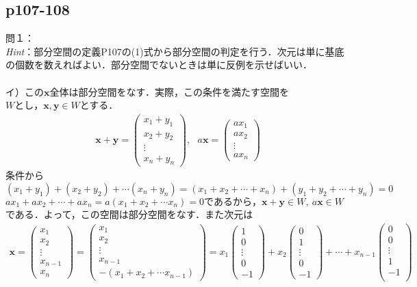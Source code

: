 \documentclass[dvipdfmx,uplatex,11pt]{jsarticle}
\begin{document}
\subsection{p107-108}
\noindent
問１：\\
\textsl{Hint}：部分空間の定義P107の(1)式から部分空間の判定を行う．次元は単に基底の個数を数えればよい．部分空間でないときは単に反例を示せばいい．\\
\dotfill \\
イ）この$\bm{x}全体は$部分空間をなす．実際，この条件を満たす空間を$Wとし，\bm{x,y} \in W$とする．
\begin{eqnarray*}
\bm{x}+\bm{y}=
\begin{pmatrix}
x_1+y_1 \\
x_2+y_2 \\
\vdots \\
x_n+y_n
\end{pmatrix}
,~~~
a\bm{x}=
\begin{pmatrix}
ax_1 \\
ax_2 \\
\vdots \\
ax_n
\end{pmatrix}
\end{eqnarray*}
条件から$(x_1+y_1)+(x_2+y_2)+\cdots (x_n+y_n)=(x_1+x_2+\cdots +x_n)+(y_1+y_2+\cdots +y_n)=0$\\
$ax_1+ax_2+ \cdots +ax_n=a(x_1+x_2+\cdots x_n)=0であるから，\bm{x}+\bm{y} \in W,~a\bm{x} \in W$である．よって，この空間は部分空間をなす．また次元は
\begin{eqnarray*}
\bm{x}=
\begin{pmatrix}
x_1 \\
x_2 \\
\vdots \\
x_{n-1} \\
x_n
\end{pmatrix}
=
\begin{pmatrix}
x_1 \\
x_2 \\
\vdots \\
x_{n-1} \\
-(x_1+x_2+\cdots x_{n-1})
\end{pmatrix}
=
x_1
\begin{pmatrix}
1 \\
0 \\
\vdots \\
0 \\
-1
\end{pmatrix}
+x_2
\begin{pmatrix}
0 \\
1 \\
\vdots \\
0 \\
-1
\end{pmatrix}
+\cdots +x_{n-1}
\begin{pmatrix}
0 \\
0 \\
\vdots \\
1 \\
-1\\
\end{pmatrix}
\end{eqnarray*}
\end{document}
